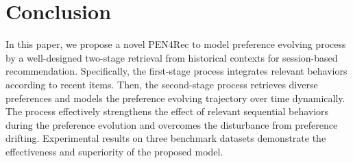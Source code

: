 \documentclass[runningheads]{llncs}
\begin{document}
\section{Conclusion} \label{sec:conclu}
In this paper, we propose a novel PEN4Rec to model preference evolving process by a well-designed two-stage retrieval from historical contexts for session-based recommendation. Specifically,  the first-stage process integrates relevant behaviors according to recent items. Then, the second-stage process retrieves diverse preferences and models the preference evolving trajectory over time dynamically. The process effectively strengthens the effect of relevant sequential behaviors during the preference evolution and overcomes the disturbance from preference drifting. Experimental results on three benchmark datasets demonstrate the effectiveness and superiority of the proposed model.  
\end{document}
